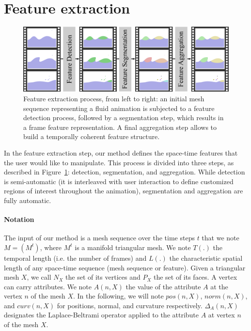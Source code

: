 \section{Feature extraction}
\label{sec:extraction}
 
 \begin{figure}
\centering
\includegraphics[width=\linewidth]{images/fluidsculpting-mig2016/feature_extraction_2.png}
\caption[Fluid sculpting: Feature extraction]{Feature extraction process, from left to right: an initial mesh sequence representing a fluid animation is subjected to a feature detection process, followed by a segmentation step, which results in a frame feature representation. 
A final aggregation step allows to build a temporally coherent feature structure.}
 \label{fig:feature_extraction}
\end{figure}

In the feature extraction step, our method defines the space-time features that the user would like to manipulate. 
This process is divided into three steps, as described in Figure~\ref{fig:feature_extraction}: detection, segmentation, and aggregation. 
While detection is semi-automatic (it is interleaved with user interaction to define customized regions of interest throughout the animation), segmentation and aggregation are fully automatic.


\paragraph{Notation}
The input of our method is a mesh sequence over the time steps $t$ that we note $M = (M^t)$, where $M^t$ is a manifold triangular mesh.
We note $T(.)$ the temporal length (i.e. the number of frames) and $L(.)$ the characteristic spatial length of any space-time sequence (mesh sequence or feature).
Given a triangular mesh $X$, we call $N_X$ the set of its vertices and $P_X$ the set of its faces.
A vertex can carry attributes. We note $A(n,X)$ the value of the attribute $A$ at the vertex $n$ of the mesh $X$. In the following, we will note $pos(n,X)$, $norm(n,X)$, and $curv(n,X)$ for positions, normal, and curvature respectively.
$\Delta_{A}(n,X)$ designates the Laplace-Beltrami operator applied to the attribute $A$ at vertex $n$ of the mesh $X$.

